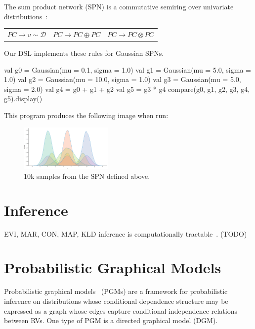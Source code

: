 \documentclass{article}
\begin{document}
The sum product network (SPN) is a commutative semiring over univariate distributions~\citep{friesen2016sum}:

\begin{center}
    \begin{tabular}{ccc}
        $PC \rightarrow v \sim \mathcal{D}$ &
        $PC \rightarrow PC \oplus PC$ &
        $PC \rightarrow PC \otimes PC$
    \end{tabular}
\end{center}

Our DSL implements these rules for Gaussian SPNs.

\begin{kotlinlisting}
val g0 = Gaussian(mu = 0.1,  sigma = 1.0)
val g1 = Gaussian(mu = 5.0,  sigma = 1.0)
val g2 = Gaussian(mu = 10.0, sigma = 1.0)
val g3 = Gaussian(mu = 5.0,  sigma = 2.0)
val g4 = g0 + g1 + g2
val g5 = g3 * g4
compare(g0, g1, g2, g3, g4, g5).display()
\end{kotlinlisting}

This program produces the following image when run:

\begin{figure}[h]
    \includegraphics[width=0.4\textwidth]{plot.png}
    \centering
    \caption{10k samples from the SPN defined above.}
\end{figure}


\section{Inference}

EVI, MAR, CON, MAP, KLD inference is computationally tractable~\citep{choi2020probabilistic}. (TODO)

\section{Probabilistic Graphical Models}

Probabilistic graphical models~\citep{jordan2003introduction,koller2009probabilistic} (PGMs) are a framework for probabilistic inference on distributions whose conditional dependence structure may be expressed as a graph whose edges capture conditional independence relations between RVs. One type of PGM is a directed graphical model (DGM).
\end{document}
